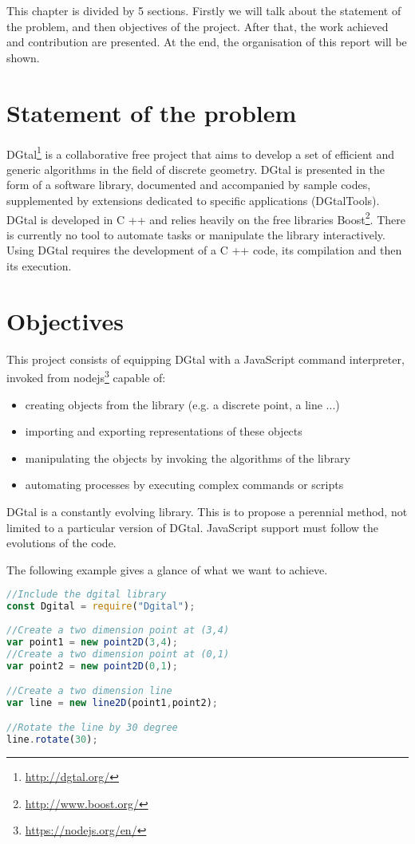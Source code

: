 This chapter is divided by 5 sections. Firstly we will talk about the statement of the problem, and then objectives of the project. After that, the work achieved and contribution are presented. At the end, the organisation of this report will be shown.

\section{Statement of the problem}

DGtal\footnote{\url{http://dgtal.org/}} is a collaborative free project that aims to develop a set of efficient and generic algorithms in the field of discrete geometry. DGtal is presented in the form of a software library, documented and accompanied by sample codes, supplemented by extensions dedicated to specific applications (DGtalTools). DGtal is developed in C ++ and relies heavily on the free libraries Boost\footnote{\url{http://www.boost.org/}}. There is currently no tool to automate tasks or manipulate the library interactively. Using DGtal requires the development of a C ++ code, its compilation and then its execution.

\section{Objectives}

This project consists of equipping DGtal with a JavaScript command interpreter, invoked from nodejs\footnote{\url{https://nodejs.org/en/}} capable of:
\begin{itemize}
    \item creating objects from the library (e.g. a discrete point, a line ...)
    \item importing and exporting representations of these objects
    \item manipulating the objects by invoking the algorithms of the library
    \item automating processes by executing complex commands or scripts
\end{itemize}
    
DGtal is a constantly evolving library. This is to propose a perennial method, not limited to a particular version of DGtal. JavaScript support must follow the evolutions of the code. 

The following example gives a glance of what we want to achieve.

       \begin{lstlisting}[language=JavaScript, caption= simple objective example]
//Include the dgital library
const Dgital = require("Dgital"); 
         
//Create a two dimension point at (3,4)  
var point1 = new point2D(3,4);
//Create a two dimension point at (0,1)  
var point2 = new point2D(0,1);

//Create a two dimension line 
var line = new line2D(point1,point2);

//Rotate the line by 30 degree
line.rotate(30);
        \end{lstlisting}

